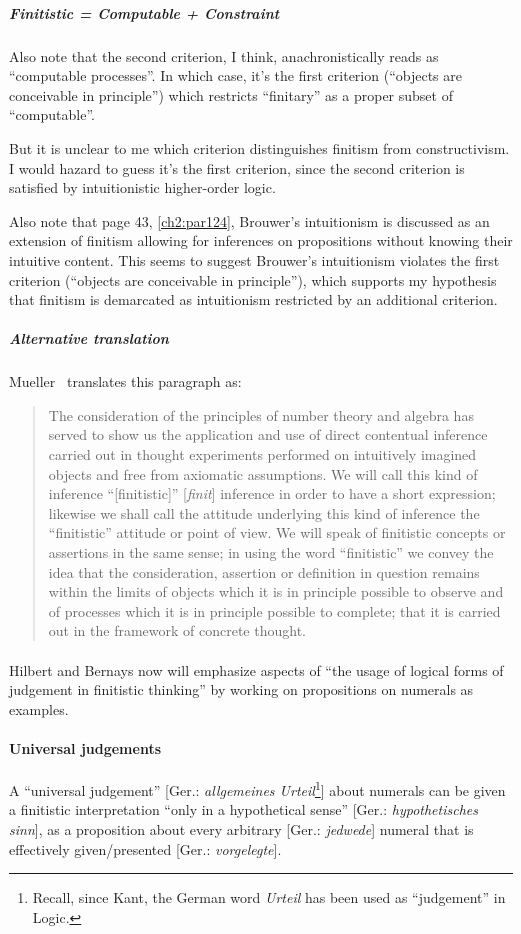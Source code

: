 \subparagraph{Finitistic = Computable + Constraint}
Also note that the second criterion, I think, anachronistically reads as
``computable processes''. In which case, it's the first criterion
(``objects are conceivable in principle'') which restricts
``finitary'' as a proper subset of ``computable''.

But it is unclear to me which criterion distinguishes finitism from
constructivism. I would hazard to guess it's the first criterion,
since the second criterion is satisfied by intuitionistic higher-order
logic.

Also note that page 43, \pilcrow\ref{ch2:par124}, Brouwer's
intuitionism is discussed as an extension of finitism allowing for
inferences on propositions without knowing their intuitive
content. This seems to suggest Brouwer's intuitionism violates the
first criterion (``objects are conceivable in principle''), which
supports my hypothesis that finitism is demarcated as intuitionism
restricted by an additional criterion.

\subparagraph{Alternative translation}
Mueller~\cite[p.44]{mueller2006grundlagen} translates this paragraph
as:
\begin{quote}
The consideration of the principles of number theory and algebra has
served to show us the application and use of direct contentual
inference carried out in thought experiments performed on intuitively
imagined objects and free from axiomatic assumptions. We will call
this kind of inference ``[finitistic]'' [\textit{finit\/}] inference
in order to have a short expression; likewise we shall call the
attitude underlying this kind of inference the ``finitistic'' attitude
or point of view. We will speak of finitistic concepts or assertions
in the same sense; in using the word ``finitistic'' we convey the idea
that the consideration, assertion or definition in question remains
within the limits of objects which it is in principle possible to
observe and of processes which it is in principle possible to
complete; that it is carried out in the framework of concrete thought.
\end{quote}

\paragraph{} %
Hilbert and Bernays now will emphasize aspects of ``the usage of
logical forms of judgement in finitistic thinking'' by working on
propositions on numerals as examples.

\paragraph{Universal judgements} %
A ``universal judgement'' [Ger.: \textit{allgemeines
    Urteil\/}\footnote{Recall, since Kant, the German word
  \textit{Urteil\/} has been used as ``judgement'' in Logic.}] about numerals can be given a finitistic
interpretation ``only in a hypothetical sense'' [Ger.: \textit{hypothetisches sinn\/}],
as a proposition about every arbitrary [Ger.: \textit{jedwede\/}]
numeral that is effectively given/presented [Ger.: \textit{vorgelegte\/}].

